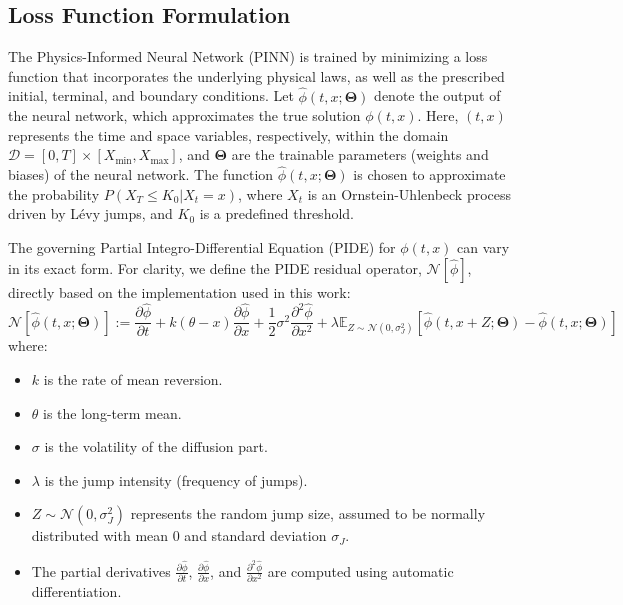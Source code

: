 \documentclass[11pt,twoside,openright]{report}
\begin{document}
\subsection{Loss Function Formulation} \label{sec:loss_function}

The Physics-Informed Neural Network (PINN) is trained by minimizing a loss function that incorporates the underlying physical laws, as well as the prescribed initial, terminal, and boundary conditions. Let $\hat{\phi}(t, x; \mathbf{\Theta})$ denote the output of the neural network, which approximates the true solution $\phi(t,x)$. Here, $(t,x)$ represents the time and space variables, respectively, within the domain $\mathcal{D} = [0, T] \times [X_{\text{min}}, X_{\text{max}}]$, and $\mathbf{\Theta}$ are the trainable parameters (weights and biases) of the neural network. The function $\hat{\phi}(t,x; \mathbf{\Theta})$ is chosen to approximate the probability $P(X_T \le K_0 | X_t = x)$, where $X_t$ is an Ornstein-Uhlenbeck process driven by L\'evy jumps, and $K_0$ is a predefined threshold.

The governing Partial Integro-Differential Equation (PIDE) for $\phi(t,x)$ can vary in its exact form. For clarity, we define the PIDE residual operator, $\mathcal{N}[\hat{\phi}]$, directly based on the implementation used in this work:
$$
\mathcal{N}[\hat{\phi}(t,x; \mathbf{\Theta})] := \frac{\partial \hat{\phi}}{\partial t} + k(\theta - x) \frac{\partial \hat{\phi}}{\partial x} + \frac{1}{2}\sigma^2 \frac{\partial^2 \hat{\phi}}{\partial x^2} + \lambda \mathbb{E}_{Z \sim \mathcal{N}(0,\sigma_J^2)}[\hat{\phi}(t, x+Z; \mathbf{\Theta}) - \hat{\phi}(t, x; \mathbf{\Theta})]
$$
where:
\begin{itemize}
    \item $k$ is the rate of mean reversion.
    \item $\theta$ is the long-term mean.
    \item $\sigma$ is the volatility of the diffusion part.
    \item $\lambda$ is the jump intensity (frequency of jumps).
    \item $Z \sim \mathcal{N}(0, \sigma_J^2)$ represents the random jump size, assumed to be normally distributed with mean 0 and standard deviation $\sigma_J$.
    \item The partial derivatives $\frac{\partial \hat{\phi}}{\partial t}$, $\frac{\partial \hat{\phi}}{\partial x}$, and $\frac{\partial^2 \hat{\phi}}{\partial x^2}$ are computed using automatic differentiation.
\end{itemize}
\end{document}
